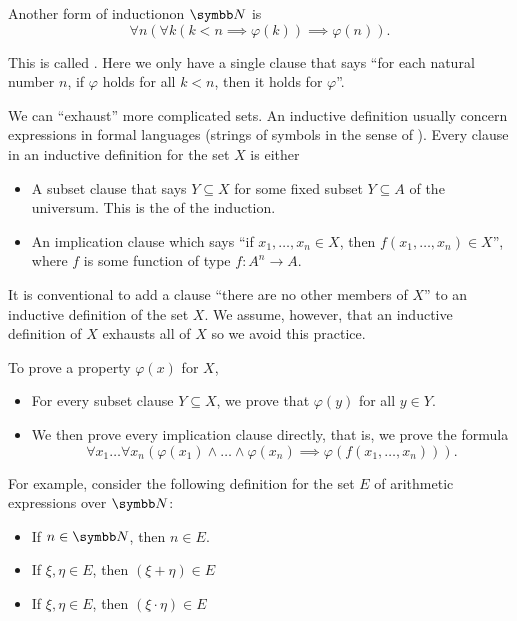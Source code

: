 \begin{remark}
  Another form of induction\IND on \( \BN \) is
  \begin{equation*}
    \forall n (\forall k (k < n \implies \varphi(k)) \implies \varphi(n)).
  \end{equation*}

  This is called . Here we only have a single clause that says \enquote{for each natural number \( n \), if \( \varphi \) holds for all \( k < n \), then it holds for \( \varphi \)}.

  We can \enquote{exhaust} more complicated sets. An inductive definition usually concern expressions in formal languages (strings of symbols in the sense of ). Every clause in an inductive definition for the set \( X \) is either
  \begin{itemize}
    \item A subset clause that says \( Y \subseteq X \) for some fixed subset \( Y \subseteq A \) of the universum. This is the  of the induction\IND.
    \item An implication clause which says \enquote{if \( x_1, \ldots, x_n \in X \), then \( f(x_1, \ldots, x_n) \in X \)}, where \( f \) is some function of type \( f: A^n \to A \).
  \end{itemize}

  It is conventional to add a clause \enquote{there are no other members of \( X \)} to an inductive definition of the set \( X \). We assume, however, that an inductive definition of \( X \) exhausts all of \( X \) so we avoid this practice.

  To prove a property \( \varphi(x) \) for \( X \),
  \begin{itemize}
    \item For every subset clause \( Y \subseteq X \), we prove that \( \varphi(y) \) for all \( y \in Y \).
    \item We then prove every implication clause directly, that is, we prove the formula
    \begin{equation*}
      \forall x_1 \ldots \forall x_n (\varphi(x_1) \land \ldots \land \varphi(x_n) \implies \varphi(f(x_1, \ldots, x_n))).
    \end{equation*}
  \end{itemize}

  For example, consider the following definition for the set \( E \) of arithmetic expressions over \( \BN \):
  \begin{itemize}
    \item If \( n \in \BN \), then \( n \in E \).
    \item If \( \xi, \eta \in E \), then \( (\xi + \eta) \in E \)
    \item If \( \xi, \eta \in E \), then \( (\xi \cdot \eta) \in E \)
  \end{itemize}


\end{remark}

